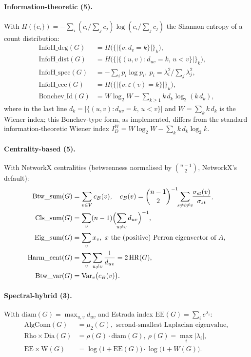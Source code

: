 \paragraph{Information-theoretic (5).}
With $H(\{c_i\}) = -\sum_i (c_i / \sum_j c_j)\log(c_i / \sum_j c_j)$
the Shannon entropy of a count distribution:
\begin{align*}
\mathrm{InfoH\_deg}(G) &= H\bigl(\{|\{v : d_v = k\}|\}_k\bigr), \\
\mathrm{InfoH\_dist}(G) &= H\bigl(\{|\{(u,v) : d_{uv} = k,\, u<v\}|\}_k\bigr), \\
\mathrm{InfoH\_spec}(G) &= -\sum_{i} p_i \log p_i,\ p_i = \lambda_i^2 / \textstyle\sum_j \lambda_j^2, \\
\mathrm{InfoH\_ecc}(G) &= H\bigl(\{|\{v : \varepsilon(v) = k\}|\}_k\bigr), \\
\mathrm{Bonchev\_Id}(G) &= W\log_2 W - \sum_{k \ge 1} k\,d_k \log_2(k\,d_k),
\end{align*}
where in the last line $d_k = |\{(u,v) : d_{uv}=k,\,u<v\}|$ and
$W = \sum_k k\,d_k$ is the Wiener index; this Bonchev-type form, as
implemented, differs from the standard information-theoretic Wiener
index $I_D^W = W\log_2W-\sum_k k\,d_k\log_2 k$.

\paragraph{Centrality-based (5).}
With NetworkX centralities (betweenness normalised by $\binom{n-1}{2}$,
NetworkX's default):
\begin{align*}
\mathrm{Btw\_sum}(G) &= \sum_{v \in V} c_B(v),\quad c_B(v) = \binom{n-1}{2}^{-1}\!\!\sum_{s \ne t \ne v}\!\!
\frac{\sigma_{st}(v)}{\sigma_{st}}, \\
\mathrm{Cls\_sum}(G) &= \sum_{v} (n-1)\Bigl(\sum_{u \ne v} d_{uv}\Bigr)^{-1}, \\
\mathrm{Eig\_sum}(G) &= \sum_{v} x_v,\ x \text{ the (positive) Perron eigenvector of } A, \\
\mathrm{Harm\_cent}(G) &= \sum_{v}\sum_{u \ne v}\frac{1}{d_{uv}} = 2\,\mathrm{HR}(G), \\
\mathrm{Btw\_var}(G) &= \mathrm{Var}_v\bigl(c_B(v)\bigr).
\end{align*}

\paragraph{Spectral-hybrid (3).}
With $\mathrm{diam}(G) = \max_{u,v} d_{uv}$ and Estrada index
$\mathrm{EE}(G) = \sum_i e^{\lambda_i}$:
\begin{align*}
\mathrm{AlgConn}(G) &= \mu_2(G), \text{ second-smallest Laplacian eigenvalue}, \\
\mathrm{Rho}\!\times\!\mathrm{Dia}(G) &= \rho(G)\cdot\mathrm{diam}(G),\ \rho(G) = \max_i|\lambda_i|, \\
\mathrm{EE}\!\times\!\mathrm{W}(G) &= \log\bigl(1+\mathrm{EE}(G)\bigr)\cdot\log\bigl(1+W(G)\bigr).
\end{align*}


